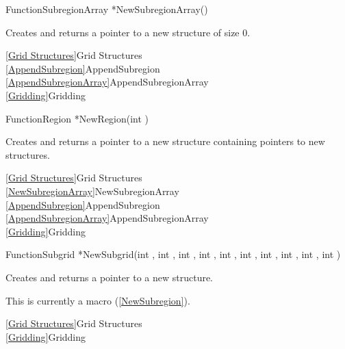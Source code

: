 {\newpage\clearpage
{}%
\begin{deftypefn}{Function}{SubregionArray *}{NewSubregionArray}()
\par
\DESCRIPTION
Creates and returns a pointer to a new  structure
of size 0.
\par
\SEEALSO
\vref{Grid Structures}{Grid Structures}\\
\vref{AppendSubregion}{AppendSubregion}\\
\vref{AppendSubregionArray}{AppendSubregionArray}\\
\vref{Gridding}{Gridding}
\par
\end{deftypefn}%
\lthtmlfigureZ
\lthtmlcheckvsize\clearpage}

{\newpage\clearpage
{}%
\begin{deftypefn}{Function}{Region *}{NewRegion}(int )
\par
\DESCRIPTION
Creates and returns a pointer to a new  structure
containing  pointers to new  structures.
\par
\SEEALSO
\vref{Grid Structures}{Grid Structures}\\
\vref{NewSubregionArray}{NewSubregionArray}\\
\vref{AppendSubregion}{AppendSubregion}\\
\vref{AppendSubregionArray}{AppendSubregionArray}\\
\vref{Gridding}{Gridding}
\par
\end{deftypefn}%
\lthtmlfigureZ
\lthtmlcheckvsize\clearpage}

{\newpage\clearpage
{}%
\begin{deftypefn}
{Function}{Subgrid *}{NewSubgrid}(int , int , int , int , int , int , int , int , int , int )
\par
\DESCRIPTION
Creates and returns a pointer to a new  structure.
\par
\NOTES
This is currently a macro (\ref{NewSubregion}).
\par
\SEEALSO
\vref{Grid Structures}{Grid Structures}\\
\vref{Gridding}{Gridding}
\par
\end{deftypefn}%
\lthtmlfigureZ
\lthtmlcheckvsize\clearpage}

